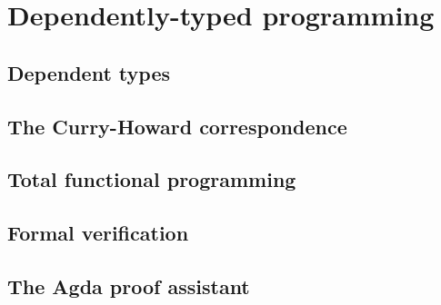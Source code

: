 \chapter{Dependently-typed programming}

\section{Dependent types}

\section{The Curry-Howard correspondence}

\section{Total functional programming}

\section{Formal verification}

\section{The Agda proof assistant}
